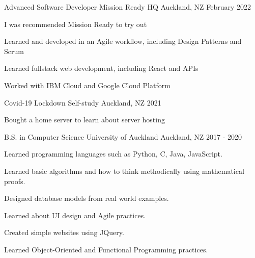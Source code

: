 

\begin{cventries}


  \cventry
    {Advanced Software Developer}
    {Mission Ready HQ}
    {Auckland, NZ}
    {February 2022}
    {
      \begin{cvitems}
        \item {I was recommended Mission Ready to try out }
        \item {Learned and developed in an Agile workflow, including Design Patterns and Scrum}
        \item {Learned fullstack web development, including React and APIs}
        \item {Worked with IBM Cloud and Google Cloud Platform}
      \end{cvitems}
    }


\cventry
{Covid-19 Lockdown}
{Self-study}
{Auckland, NZ}
{2021}
{
  \begin{cvitems}
    \item {Bought a home server to learn about server hosting}
  \end{cvitems}
}

  \cventry
    {B.S. in Computer Science} %
    {University of Auckland} %
    {Auckland, NZ} %
    {2017 - 2020} %
    {
      \begin{cvitems} %
        \item {Learned programming languages such as Python, C, Java, JavaScript.}
        \item {Learned basic algorithms and how to think methodically using mathematical proofs.}
        \item {Designed database models from real world examples.}
        \item {Learned about UI design and Agile practices.}
        \item {Created simple websites using JQuery.}
        \item {Learned Object-Oriented and Functional Programming practices.}
      \end{cvitems}
    }

\end{cventries}
